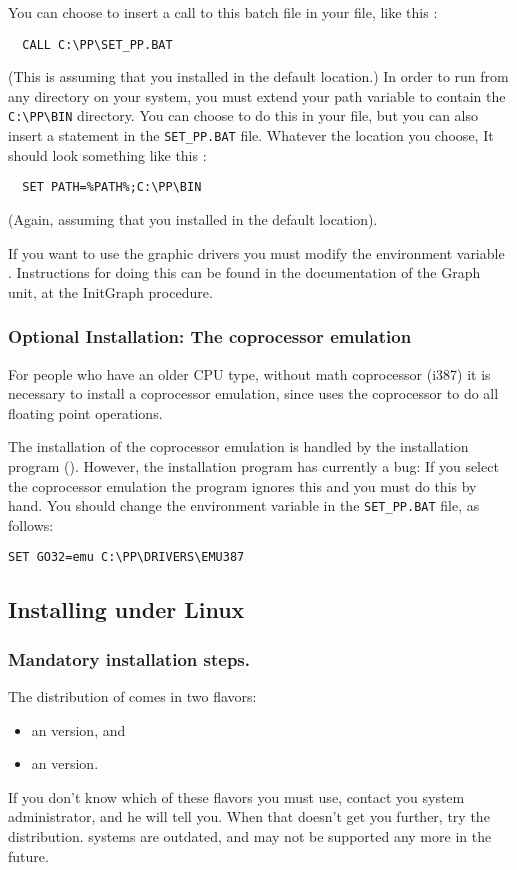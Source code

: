 \documentclass{report}
\begin{document}
You can choose to insert a call to this batch file in your 
file, like this :
\begin{verbatim}
  CALL C:\PP\SET_PP.BAT
\end{verbatim}
(This is assuming that you installed \fpk in the default location.)
In order to run \fpk from any directory on your system, you must extend 
your path variable to contain the \verb|C:\PP\BIN| directory.
You can choose to do this in your  file, but you can also
insert a statement in the \verb|SET_PP.BAT| file. Whatever the location you
choose, It should look something like this : 
\begin{verbatim}
  SET PATH=%PATH%;C:\PP\BIN
\end{verbatim}
(Again, assuming that you installed in the default location).
 
If you want to use the graphic drivers you must modify the
environment variable . Instructions for doing this can be found
in the documentation of the Graph unit, at the InitGraph procedure.

\subsubsection{Optional Installation: The coprocessor emulation}
For people who have an older CPU type, without math coprocessor (i387)
it is necessary to install a coprocessor emulation, since \fpk uses the
coprocessor to do all floating point operations.

The installation of the coprocessor emulation is handled by the 
installation program (). However,
the installation program has currently a bug: If you select the
coprocessor emulation the program ignores this and you must do
this by hand. You should change the  environment variable in
the \verb|SET_PP.BAT| file, as follows:
\begin{verbatim}
SET GO32=emu C:\PP\DRIVERS\EMU387 
\end{verbatim}


%
%

\subsection{Installing under Linux}
\subsubsection{Mandatory installation steps.}
The \linux distribution of \fpk comes in two flavors:
\begin{itemize}
\item an  version, and
\item an  version.
\end{itemize}
If you don't know which of these flavors you must use, contact you system
administrator, and he will tell you. When that doesn't get you further, try
the  distribution.  systems are outdated, and may not be
supported any more in the future.
\end{document}
